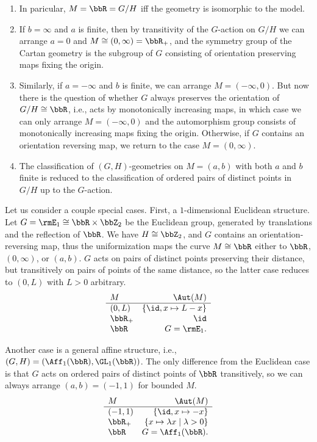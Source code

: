 \begin{example}
    \begin{enumerate}
        \item In paricular, $M=\bbR=G\slash H$ iff the geometry is isomorphic to the model. 
        \item If $b=\infty$ and $a$ is finite, then by transitivity of the $G$-action on $G\slash H$ we can arrange $a=0$ and $M\cong (0,\infty)=\bbR_+$, and the symmetry group of the Cartan geometry is the subgroup of $G$ consisting of orientation preserving maps fixing the origin.
        \item Similarly, if $a=-\infty$ and $b$ is finite, we can arrange $M=(-\infty,0)$. But now there is the question of whether $G$ always preserves the orientation of $G\slash H\cong\bbR$, i.e., acts by monotonically increasing maps, in which case we can only arrange $M=(-\infty,0)$ and the automorphism group consists of monotonically increasing maps fixing the origin. Otherwise, if $G$ contains an orientation reversing map, we return to the case $M=(0,\infty)$.
        \item The classification of $(G,H)$-geometries on $M=(a,b)$ with both $a$ and $b$ finite is reduced to the classification of ordered pairs of distinct points in $G\slash H$ up to the $G$-action.
    \end{enumerate} 

    Let us consider a couple special cases. First, a $1$-dimensional Euclidean structure. Let $G=\rmE_1\cong \bbR\times\bbZ_2$ be the Euclidean group, generated by translations and the reflection of $\bbR$. We have $H\cong \bbZ_2$, and $G$ contains an orientation-reversing map, thus the uniformization maps the curve $M\cong\bbR$ either to $\bbR$, $(0,\infty)$, or $(a,b)$. $G$ acts on pairs of distinct points preserving their distance, but transitively on pairs of points of the same distance, so the latter case reduces to $(0,L)$ with $L>0$ arbitrary. 
    \[
    \begin{array}{lr}
        M & \Aut(M)  \\\hline
        (0,L) & \{\id,x\mapsto L-x\}\\
        \bbR_+ & \id\\
        \bbR & G=\rmE_1.
    \end{array}
    \]

    Another case is a general affine structure, i.e., $(G,H)=(\Aff_1(\bbR),\GL_1(\bbR))$. The only difference from the Euclidean case is that $G$ acts on ordered pairs of distinct points of $\bbR$ transitively, so we can always arrange $(a,b)=(-1,1)$ for bounded $M$.
    \[\begin{array}{lr}
        M & \Aut(M)  \\\hline
        (-1,1) & \{\id,x\mapsto -x\}\\
        \bbR_+ & \{x\mapsto \lambda x\mid \lambda>0\}\\
        \bbR & G=\Aff_1(\bbR).
    \end{array}\]
\end{example}

